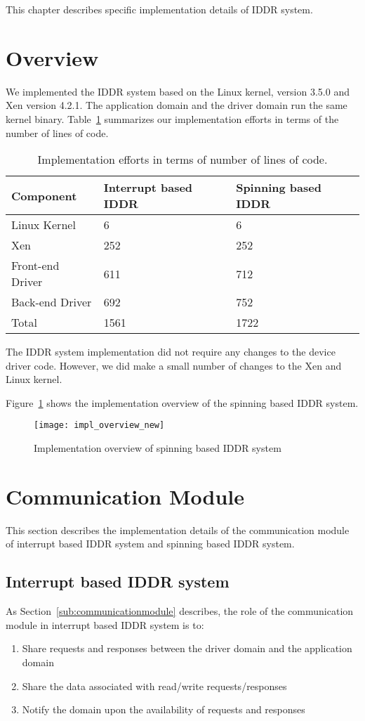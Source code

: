 This chapter describes specific implementation details of IDDR system.

\section{Overview} 
We implemented the IDDR system based on the Linux kernel, version 3.5.0 and
Xen version 4.2.1. The application domain and the driver domain run the same kernel
binary. Table~\ref{tab:base} summarizes our implementation efforts in
terms of the number of lines of code.

\begin{table}
\caption{Implementation efforts in terms of number of lines of code.}
\begin{center}
\begin{tabular}{lll}
  \hline
  \label{tab:base}
  Component & Interrupt based IDDR & Spinning based IDDR \\
  \hline
  Linux Kernel & 6 & 6\\
  Xen & 252 & 252\\
  Front-end Driver & 611 & 712\\
  Back-end Driver & 692 & 752\\
  \hline 
  Total & 1561 & 1722\\
  \hline
\end{tabular}
\end{center}
\end{table}

The IDDR system implementation did not require any changes to the device
driver code. However, we did make a small number of changes to the Xen
and Linux kernel.

Figure~\ref{fig:Implementation overview} shows the implementation overview of 
the spinning based IDDR system.

\begin{figure}[!ht]
\centering
\texttt{[image: impl\_overview\_new]}
\caption{Implementation overview of spinning based IDDR system}
\label{fig:Implementation overview}
\end{figure}

\section{Communication Module}
This section describes the implementation details of the communication
module of interrupt based IDDR system and spinning based IDDR system.

\subsection{Interrupt based IDDR system}
As Section~\ref{sub:communicationmodule} describes, the role of the communication module in interrupt based IDDR system is to:
\begin{enumerate} 
\item Share requests and responses between the driver domain and the application domain
\item Share the data associated with read/write requests/responses
\item Notify the domain upon the availability of requests and responses 
\end{enumerate}
